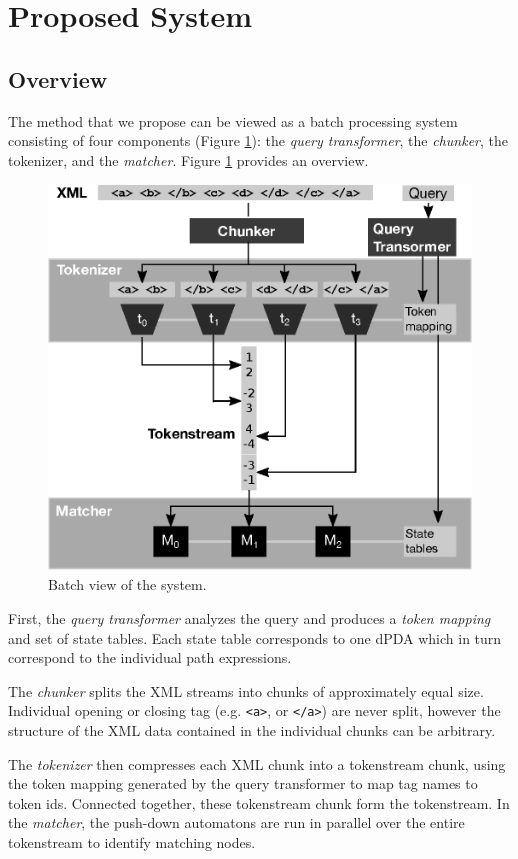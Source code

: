 \section{Proposed System}\label{sec:yourmethod}

\subsection{Overview}

The method that we propose can be viewed as a batch processing system consisting
of four components (Figure \ref{fig:methodoverview}): the \emph{query
transformer}, the \emph{chunker}, the {tokenizer}, and the \emph{matcher}.
Figure \ref{fig:methodoverview} provides an overview.

\begin{figure}[tb]\centering
	\includegraphics[width=.5\textwidth]{img/methodoverview.eps}
  \caption{Batch view of the system.}
  \label{fig:methodoverview}
\end{figure}

First, the \emph{query transformer} analyzes the query and produces a
\emph{token mapping} and set of state tables. Each state table corresponds to
one dPDA which in turn correspond to the individual path expressions.

The \emph{chunker} splits the XML streams into chunks of approximately equal
size. Individual opening or closing tag (e.g. \verb;<a>;, or \verb;</a>;) are
never split, however the structure of the XML data contained in the individual
chunks can be arbitrary.

The \emph{tokenizer} then compresses each XML chunk into a tokenstream chunk,
using the token mapping generated by the query transformer to map tag names to
token ids. Connected together, these tokenstream chunk form the tokenstream. In
the \emph{matcher}, the push-down automatons are run in parallel over the
entire tokenstream to identify matching nodes.

